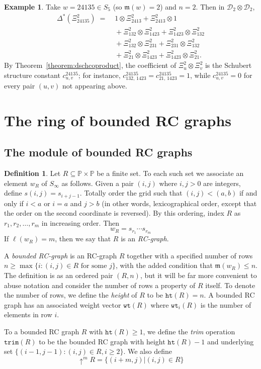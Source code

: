 \documentclass{amsart}
\theoremstyle{definition}
\newtheorem{definition}[lemma]{Definition}
\newtheorem{example}[lemma]{Example}
\theoremstyle{remark}
\numberwithin{equation}{subsection}
\newcommand{\shup}{{\uparrow}}
\newcommand{\wof}[1]{w_{#1}}
\newcommand{\wtt}{\mathtt{wt}}
\newcommand{\trm}{\mathtt{trim}}
\newcommand{\hr}{\mathtt{ht}}
\newcommand{\dsch}{\ensuremath{\Xi}}
\newcommand{\dcoma}{\mathcal{D}}
\newcommand{\maxd}{\mathfrak{m}}
\begin{document}
\begin{example}\label{example:dschcoproduct}
Take $w=24135\in S_5$ (so $\maxd(w)=2$) and $n=2$. Then in $\dcoma_2\otimes\dcoma_2$,
\begin{align*}
\Delta^*(\dsch_{24135}^2) \;=\;& 1\otimes \dsch_{2413}^2 + \dsch_{2413}^2\otimes 1\\
&{}+ \dsch_{132}^2\otimes \dsch_{1423}^2 + \dsch_{1423}^2\otimes \dsch_{132}^2\\
&{}+ \dsch_{132}^2\otimes \dsch_{231}^2 + \dsch_{231}^2\otimes \dsch_{132}^2\\
&{}+ \dsch_{21}^2\otimes \dsch_{1423}^2 + \dsch_{1423}^2\otimes \dsch_{21}^2.
\end{align*}
By Theorem~\ref{theorem:dschcoproduct}, the coefficient of $\dsch_u^2\otimes\dsch_v^2$ is the Schubert structure constant $c_{u,v}^{24135}$; for instance, $c_{132,\,1423}^{24135} = c_{21,\,1423}^{24135} = 1$, while $c_{u,v}^{24135}=0$ for every pair $(u,v)$ not appearing above.
\end{example}


\section{The ring of bounded RC graphs}\label{section:brc}

\subsection{The module of bounded RC graphs}

\begin{definition}\label{definition:rcgraph}
	Let $R\subseteq \mathbb{P}\times \mathbb{P}$ be a finite set. To each such set we associate an element $\wof{R}$ of $S_\infty$ as follows. Given a pair $(i, j)$ where $i,j>0$ are integers, define $s(i,j) = s_{i+j - 1}$. Totally order the grid such that $(i, j) < (a, b)$ if and only if $i < a$ or $i = a$ and $j > b$ (in other words, lexicographical order, except that the order on the second coordinate is reversed). By this ordering, index $R$ as $r_1, r_2,\ldots, r_m$ in increasing order. Then
	$$\wof{R} = s_{r_1}\cdots s_{r_m}$$
	If $\ell(\wof{R}) = m$, then we say that $R$ is an \emph{RC-graph}.
	
	A \emph{bounded RC-graph} is an RC-graph $R$ together with a specified number of rows $n\geq \max\{i: (i,j)\in R\text{ for some }j\}$, with the added condition that $\maxd(\wof{R})\leq n$. The definition is as an ordered pair $(R, n)$, but it will be far more convenient to abuse notation and consider the number of rows a property of $R$ itself. To denote the number of rows, we define the \emph{height} of $R$ to be $\hr(R)=n$. A bounded RC graph has an associated weight vector $\wtt(R)$ where $\wtt_i(R)$ is the number of elements in row $i$.

  
	
	To a bounded RC graph $R$ with $\hr(R)\geq 1$, we define the \emph{trim} operation $\trm(R)$ to be the bounded RC graph with height $\hr(R)-1$ and underlying set $\{(i-1, j-1): (i,j)\in R, i\geq 2\}$. We also define
	$$\shup^m R=\{(i+m, j)| (i,j)\in R\}$$
\end{definition}
\end{document}
